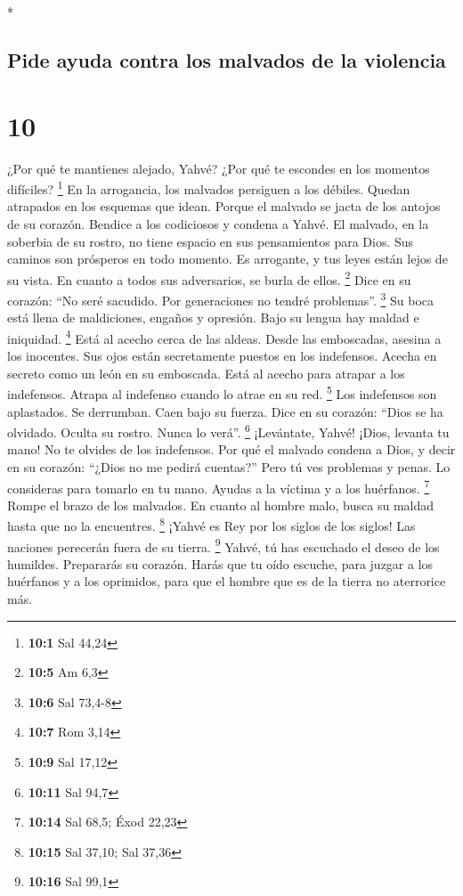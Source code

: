 \begin{paracol}{2}
\begin{otherlanguage}{english}
\end{otherlanguage}

\switchcolumn[0]*

\hypertarget{pide-ayuda-contra-los-malvados-de-la-violencia}{%
\subsection{Pide ayuda contra los malvados de la
violencia}\label{pide-ayuda-contra-los-malvados-de-la-violencia}}

\hypertarget{section-18}{%
\section{10}\label{section-18}}

 ¿Por qué te mantienes alejado, Yahvé? ¿Por qué te
escondes en los momentos difíciles? \footnote{\textbf{10:1} Sal 44,24}
 En la arrogancia, los malvados persiguen a los débiles.
Quedan atrapados en los esquemas que idean.  Porque el
malvado se jacta de los antojos de su corazón. Bendice a los codiciosos
y condena a Yahvé.  El malvado, en la soberbia de su
rostro, no tiene espacio en sus pensamientos para Dios. 
Sus caminos son prósperos en todo momento. Es arrogante, y tus leyes
están lejos de su vista. En cuanto a todos sus adversarios, se burla de
ellos. \footnote{\textbf{10:5} Am 6,3}  Dice en su
corazón: ``No seré sacudido. Por generaciones no tendré problemas''.
\footnote{\textbf{10:6} Sal 73,4-8}  Su boca está llena de
maldiciones, engaños y opresión. Bajo su lengua hay maldad e iniquidad.
\footnote{\textbf{10:7} Rom 3,14}  Está al acecho cerca de
las aldeas. Desde las emboscadas, asesina a los inocentes. Sus ojos
están secretamente puestos en los indefensos.  Acecha en
secreto como un león en su emboscada. Está al acecho para atrapar a los
indefensos. Atrapa al indefenso cuando lo atrae en su red. \footnote{\textbf{10:9}
  Sal 17,12}  Los indefensos son aplastados. Se
derrumban. Caen bajo su fuerza.  Dice en su corazón:
``Dios se ha olvidado. Oculta su rostro. Nunca lo verá''. \footnote{\textbf{10:11}
  Sal 94,7}  ¡Levántate, Yahvé! ¡Dios, levanta tu mano!
No te olvides de los indefensos.  Por qué el malvado
condena a Dios, y decir en su corazón: ``¿Dios no me pedirá cuentas?''
 Pero tú ves problemas y penas. Lo consideras para
tomarlo en tu mano. Ayudas a la víctima y a los huérfanos. \footnote{\textbf{10:14}
  Sal 68,5; Éxod 22,23}  Rompe el brazo de los malvados.
En cuanto al hombre malo, busca su maldad hasta que no la encuentres.
\footnote{\textbf{10:15} Sal 37,10; Sal 37,36}  ¡Yahvé es
Rey por los siglos de los siglos! Las naciones perecerán fuera de su
tierra. \footnote{\textbf{10:16} Sal 99,1}  Yahvé, tú has
escuchado el deseo de los humildes. Prepararás su corazón. Harás que tu
oído escuche,  para juzgar a los huérfanos y a los
oprimidos, para que el hombre que es de la tierra no aterrorice más.


\end{paracol}
